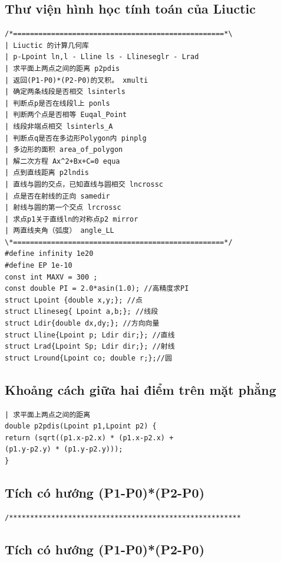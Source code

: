\documentclass[11pt]{article}
\begin{document}
\subsection{Thư viện hình học tính toán của Liuctic}

\begingroup
\scriptsize
\begin{verbatim}
/*==================================================*\
| Liuctic 的计算几何库
| p-Lpoint ln,l - Lline ls - Llineseglr - Lrad
| 求平面上两点之间的距离 p2pdis
| 返回(P1-P0)*(P2-P0)的叉积。 xmulti
| 确定两条线段是否相交 lsinterls
| 判断点p是否在线段l上 ponls
| 判断两个点是否相等 Euqal_Point
| 线段非端点相交 lsinterls_A
| 判断点q是否在多边形Polygon内 pinplg
| 多边形的面积 area_of_polygon
| 解二次方程 Ax^2+Bx+C=0 equa
| 点到直线距离 p2lndis
| 直线与圆的交点，已知直线与圆相交 lncrossc
| 点是否在射线的正向 samedir
| 射线与圆的第一个交点 lrcrossc
| 求点p1关于直线ln的对称点p2 mirror
| 两直线夹角（弧度） angle_LL
\*==================================================*/
#define infinity 1e20
#define EP 1e-10
const int MAXV = 300 ;
const double PI = 2.0*asin(1.0); //高精度求PI
struct Lpoint {double x,y;}; //点
struct Llineseg{ Lpoint a,b;}; //线段
struct Ldir{double dx,dy;}; //方向向量
struct Lline{Lpoint p; Ldir dir;}; //直线
struct Lrad{Lpoint Sp; Ldir dir;}; //射线
struct Lround{Lpoint co; double r;};//圆
\end{verbatim}
\endgroup

\subsection{Khoảng cách giữa hai điểm trên mặt phẳng}

\begingroup
\scriptsize
\begin{verbatim}
| 求平面上两点之间的距离
double p2pdis(Lpoint p1,Lpoint p2) {
return (sqrt((p1.x-p2.x) * (p1.x-p2.x) +
(p1.y-p2.y) * (p1.y-p2.y)));
}
\end{verbatim}
\endgroup

\subsection{Tích có hướng (P1-P0)*(P2-P0)}

\begingroup
\scriptsize
\begin{verbatim}
/*******************************************************
\end{verbatim}
\endgroup

\subsection{Tích có hướng (P1-P0)*(P2-P0)}
\end{document}
